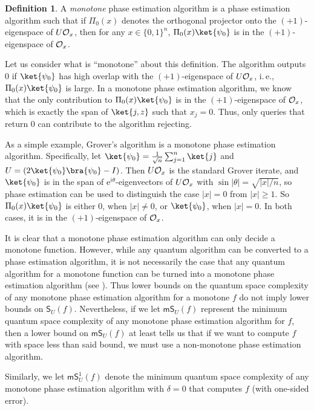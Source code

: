 \documentclass[11pt]{article}
\numberwithin{equation}{section}
\theoremstyle{definition}
\newtheorem{definition}[theorem]{Definition}
\theoremstyle{plain}
\newcommand{\eee}{\mathrm e}
\newcommand{\ie}{i.\,e.}
\begin{document}
\begin{definition}\label{def:monotone}
A \emph{monotone} phase estimation algorithm is a phase estimation algorithm such that if $\Pi_0(x)$ denotes the orthogonal projector onto the $(+1)$-eigenspace of $U{\cal O}_x$, then for any $x\in\{0,1\}^n$, $\Pi_0(x)\ket{\psi_0}$ is in the $(+1)$-eigenspace of ${\cal O}_x$. 
\end{definition}

Let us consider what is ``monotone'' about this definition. The algorithm outputs 0 if $\ket{\psi_0}$ has high overlap with the $(+1)$-eigenspace of $U{\cal O}_x$, \ie, $\Pi_0(x)\ket{\psi_0}$ is large. In a monotone phase estimation algorithm, we know that the only contribution to $\Pi_0(x)\ket{\psi_0}$ is in the $(+1)$-eigenspace of ${\cal O}_x$, which is exactly the span of $\ket{j,z}$ such that $x_j=0$. Thus, only queries that return 0 can contribute to the algorithm rejecting. 

As a simple example, Grover's algorithm is a monotone phase estimation algorithm. Specifically, let $\ket{\psi_0}=\frac{1}{\sqrt{n}}\sum_{j=1}^n\ket{j}$ and $U=(2\ket{\psi_0}\bra{\psi_0}-I)$. Then $U{\cal O}_x$ is the standard Grover iterate, and $\ket{\psi_0}$ is in the span of $\eee^{i\theta}$-eigenvectors of $U{\cal O}_x$ with $\sin|\theta|=\sqrt{|x|/n}$, so phase estimation can be used to distinguish the case $|x|=0$ from $|x|\geq 1$. So $\Pi_0(x)\ket{\psi_0}$ is either 0, when $|x|\neq 0$, or $\ket{\psi_0}$, when $|x|=0$. In both cases, it is in the $(+1)$-eigenspace of ${\cal O}_x$.

It is clear that a monotone phase estimation algorithm can only decide a monotone function. However, while any quantum algorithm can be converted to a phase estimation algorithm, it is not necessarily the case that any quantum algorithm for a monotone function can be turned into a monotone phase estimation algorithm (see ). 
Thus lower bounds on the quantum space complexity of any monotone phase estimation algorithm for a monotone $f$ do not imply lower bounds on $\mathsf{S}_U(f)$. Nevertheless, if we let $\mathsf{mS}_U(f)$ represent the minimum quantum space complexity of any monotone phase estimation algorithm for $f$, then a lower bound on $\mathsf{mS}_U(f)$ at least tells us that if we want to compute $f$ with space less than said bound, we must use a non-monotone phase estimation algorithm. 

Similarly, we let $\mathsf{mS}_U^1(f)$ denote the minimum quantum space complexity of any monotone phase estimation algorithm with $\delta=0$ that computes $f$ (with one-sided error). 
\end{document}
